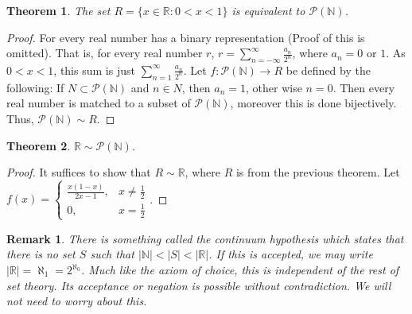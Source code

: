 \documentclass[oneside]{book}
\theoremstyle{mystyle}
\newtheorem{theorem}{Theorem}[section]
\newtheorem{remark}{Remark}[section]
\begin{document}
\begin{theorem}
The set $R=\{x\in \mathbb{R}:0<x<1\}$ is equivalent to $\mathcal{P}(\mathbb{N})$.
\end{theorem}
\begin{proof}
For every real number has a binary representation (Proof of this is omitted). That is, for every real number $r$, $ r = \sum_{n=-\infty}^{\infty} \frac{a_n}{2^n}$, where $a_n = 0$ or $1$. As $0<x<1$, this sum is just $\sum_{n=1}^{\infty} \frac{a_n}{2^n}$. Let $f:\mathcal{P}(\mathbb{N})\rightarrow R$ be defined by the following: If $N\subset \mathcal{P}(\mathbb{N})$ and $n\in N$, then $a_n = 1$, other wise $n=0$. Then every real number is matched to a subset of $\mathcal{P}(\mathbb{N})$, moreover this is done bijectively. Thus, $\mathcal{P}(\mathbb{N})\sim R$.
\end{proof}

\begin{theorem}
$\mathbb{R} \sim \mathcal{P}(\mathbb{N})$.
\end{theorem}
\begin{proof}
It suffices to show that $R\sim \mathbb{R}$, where $R$ is from the previous theorem. Let $f(x) = \begin{cases} \frac{x(1-x)}{2x-1}, & x \ne \frac{1}{2} \\ 0, & x = \frac{1}{2}\end{cases}$.
\end{proof}

\begin{remark}
There is something called the continuum hypothesis which states that there is no set $S$ such that $|\mathbb{N}| < |S| < |\mathbb{R}|$. If this is accepted, we may write $|\mathbb{R}| = \aleph_1 = 2^{\aleph_0}$. Much like the axiom of choice, this is independent of the rest of set theory. Its acceptance or negation is possible without contradiction. We will not need to worry about this.
\end{remark}
%
\end{document}
